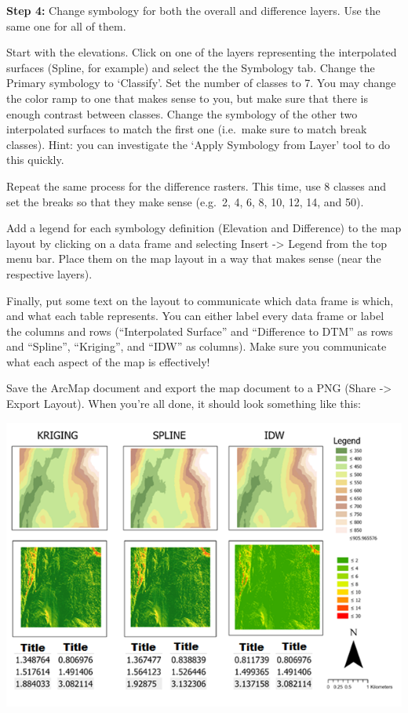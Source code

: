 \documentclass[
]{book}
\begin{document}
\textbf{Step 4:} Change symbology for both the overall and difference layers. Use the same one for all of them.

Start with the elevations. Click on one of the layers representing the interpolated surfaces (Spline, for example) and select the the Symbology tab. Change the Primary symbology to `Classify'. Set the number of classes to 7. You may change the color ramp to one that makes sense to you, but make sure that there is enough contrast between classes. Change the symbology of the other two interpolated surfaces to match the first one (i.e.~make sure to match break classes). Hint: you can investigate the `Apply Symbology from Layer' tool to do this quickly.

Repeat the same process for the difference rasters. This time, use 8 classes and set the breaks so that they make sense (e.g.~2, 4, 6, 8, 10, 12, 14, and 50).

Add a legend for each symbology definition (Elevation and Difference) to the map layout by clicking on a data frame and selecting Insert -\textgreater{} Legend from the top menu bar. Place them on the map layout in a way that makes sense (near the respective layers).

Finally, put some text on the layout to communicate which data frame is which, and what each table represents. You can either label every data frame or label the columns and rows (``Interpolated Surface'' and ``Difference to DTM'' as rows and ``Spline'', ``Kriging'', and ``IDW'' as columns). Make sure you communicate what each aspect of the map is effectively!

Save the ArcMap document and export the map document to a PNG (Share -\textgreater{} Export Layout). When you're all done, it should look something like this:

\begin{center}\includegraphics[width=0.75\linewidth]{images/04-map-document} \end{center}
\end{document}
